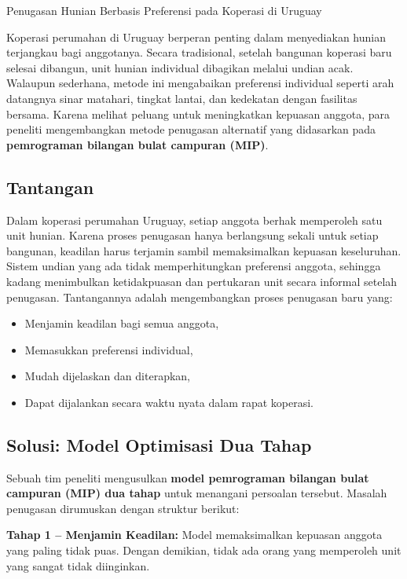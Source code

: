 \begin{casestudybox}{Penugasan Hunian Berbasis Preferensi pada Koperasi di Uruguay}
\label{case:housing-uruguay}

Koperasi perumahan di Uruguay berperan penting dalam menyediakan hunian terjangkau bagi anggotanya. Secara tradisional, setelah bangunan koperasi baru selesai dibangun, unit hunian individual dibagikan melalui undian acak. Walaupun sederhana, metode ini mengabaikan preferensi individual seperti arah datangnya sinar matahari, tingkat lantai, dan kedekatan dengan fasilitas bersama. Karena melihat peluang untuk meningkatkan kepuasan anggota, para peneliti mengembangkan metode penugasan alternatif yang didasarkan pada \textbf{pemrograman bilangan bulat campuran (MIP)}.

\subsection*{Tantangan}
Dalam koperasi perumahan Uruguay, setiap anggota berhak memperoleh satu unit hunian. Karena proses penugasan hanya berlangsung sekali untuk setiap bangunan, keadilan harus terjamin sambil memaksimalkan kepuasan keseluruhan. Sistem undian yang ada tidak memperhitungkan preferensi anggota, sehingga kadang menimbulkan ketidakpuasan dan pertukaran unit secara informal setelah penugasan. Tantangannya adalah mengembangkan proses penugasan baru yang:
\begin{itemize}
    \item Menjamin keadilan bagi semua anggota,
    \item Memasukkan preferensi individual,
    \item Mudah dijelaskan dan diterapkan,
    \item Dapat dijalankan secara waktu nyata dalam rapat koperasi.
\end{itemize}

\subsection*{Solusi: Model Optimisasi Dua Tahap}
Sebuah tim peneliti mengusulkan \textbf{model pemrograman bilangan bulat campuran (MIP) dua tahap} untuk menangani persoalan tersebut. Masalah penugasan dirumuskan dengan struktur berikut:

\textbf{Tahap 1 – Menjamin Keadilan:} Model memaksimalkan kepuasan anggota yang paling tidak puas. Dengan demikian, tidak ada orang yang memperoleh unit yang sangat tidak diinginkan.


\end{casestudybox}
